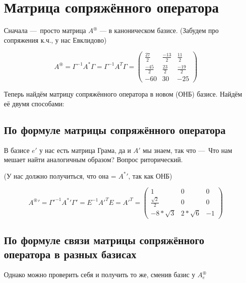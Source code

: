 \documentclass[12pt, a4paper]{article}
\begin{document}
    \section{Матрица сопряжённого оператора}

    Сначала — просто матрица $A^{\circledast}$ — в каноническом базисе. 
    (Забудем про сопряжения к.ч., у нас Евклидово)
    
    \begin{equation}
        A^{\circledast} = \Gamma^{-1} A^{*} \Gamma = \Gamma^{-1} A^T \Gamma = \left(\begin{matrix}
            \frac{27}{2} & \frac{-13}{2} & \frac{11}{2} \\
            \frac{-45}{2} & \frac{23}{2} & \frac{-19}{2} \\
            -60 & 30 & -25
        \end{matrix}\right)
    \end{equation}

    Теперь найдём матрицу сопряжённого оператора в новом (ОНБ) базисе.
    Найдём её двумя способами:

    \subsection{По формуле матрицы сопряжённого оператора}

    В базисе $e'$ у нас есть матрица Грама, да и $A'$ мы знаем, 
    так что — Что нам мешает найти аналогичным образом? 
    Вопрос риторический.

    (У нас должно получиться, что она = ${A^*}'$, так как ОНБ)

    \begin{equation}
        {A^{\circledast}}' = {\Gamma'}^{-1} {A^{*}}' \Gamma' 
        = E^{-1} {A'}^T E = {A'}^T = \left(\begin{matrix}
            1 & 0 & 0 \\
            \frac{\sqrt{2}}{2} & 0 & 0 \\
            -8*\sqrt{3} & 2*\sqrt{6} & -1
        \end{matrix}\right)
    \end{equation}

    \subsection{По формуле связи матрицы сопряжённого оператора в разных базисах}

    Однако можно проверить себя и получить то же, сменив базис у $A^{\circledast}_e$
\end{document}
